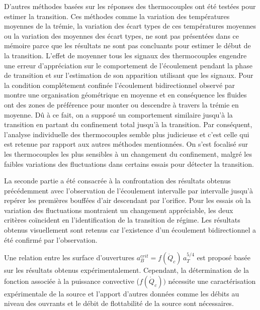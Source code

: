 D'autres méthodes basées sur les réponses des thermocouples ont été testées pour estimer la transition. Ces méthodes comme la variation des températures moyennes de la trémie, la variation des écart types de ces températures moyennes ou la variation des moyennes des écart types, ne sont pas présentées dans ce mémoire parce que les résultats ne sont pas concluants pour estimer le début de la transition. L'effet de moyenner tous les signaux des thermocouples engendre une erreur d'appréciation sur le comportement de l'écoulement pendant la phase de transition et sur l'estimation de son apparition utilisant que les signaux. Pour la condition complétement confinée l'écoulement bidirectionnel observé par \textcite{varrall_2016} montre une organisation géométrique en moyenne et en conséquence les fluides ont des zones de préférence pour monter ou descendre à travers la trémie en moyenne. Dû à ce fait, on a supposé un comportement similaire jusqu'à la transition en partant du confinement total jusqu'à la transition. Par conséquent, l'analyse individuelle des thermocouples semble plus judicieuse et c'est celle qui est retenue par rapport aux autres méthodes mentionnées. On s'est focalisé sur les thermocouples les plus sensibles à un changement du confinement, malgré les faibles variations des fluctuations dans certains essais pour détecter la transition.

La seconde partie a été consacrée à la confrontation des résultats obtenus précédemment avec l'observation de l'écoulement intervalle par intervalle jusqu'à repérer les premières bouffées d'air descendant par l'orifice. Pour les essais où la variation des fluctuations montraient un changement appréciable, les deux critères coïncident en l'identification de la transition de régime. Les résultats obtenus visuellement sont retenus car l'existence d'un écoulement bidirectionnel a été confirmé par l'observation.

Une relation entre les surface d'ouvertures $a_B^{crit} = f(\dot{Q}_c)\, a_T^{5/4}$ est proposé basée sur les résultats obtenus expérimentalement. Cependant, la détermination de la fonction associée à la puissance convective ($f(\dot{Q}_c))$ nécessite une caractérisation expérimentale de la source et l'apport d'autres données comme les débits au niveau des ouvrants et le débit de flottabilité de la source sont nécessaires.



